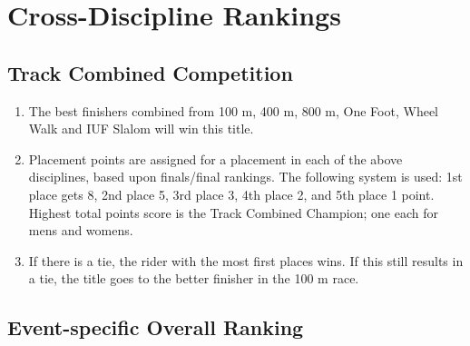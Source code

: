 \section{Cross-Discipline Rankings}

\subsection{Track Combined Competition}

\begin{enumerate}[leftmargin=1.5em,labelsep=*]
	\item The best finishers combined from 100 m, 400 m, 800 m, One Foot, Wheel Walk and IUF Slalom will win this title.
	\item Placement points are assigned for a placement in each of the above disciplines, based upon 
  finals/final rankings.
	The following system is used: 1st place gets 8, 2nd place 5, 3rd place 3, 4th place 2, and 5th place 1 point.
	Highest total points score is the Track Combined Champion; one each for mens and womens.
	\item If there is a tie, the rider with the most first places wins. If this still results	in a tie, 
  the title goes to the better finisher in the 100 m race.
\end{enumerate}

\subsection{Event-specific Overall Ranking}

